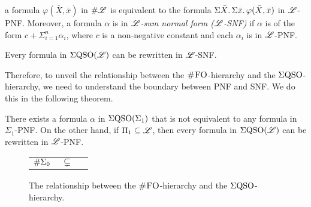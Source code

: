 a formula $\varphi(\bar{X}, \bar{x})$ in $\#\mathscr{L}$ is equivalent to the formula $\Sigma{\bar X}.\, \Sigma{\bar x}.\, \varphi(\bar{X}, \bar{x})$ in $\mathscr{L}$-PNF. 
Moreover, a formula $\alpha$ is in \emph{$\mathscr{L}$-sum normal form ($\mathscr{L}$-SNF)} if $\alpha$ is of the form $c + \Sigma_{i=1}^n \alpha_i$, where $c$ is a non-negative constant and each $\alpha_i$ is in 
$\mathscr{L}$-PNF.
\begin{theorem}\label{theo-pnf-snf}
Every formula in $\Sigma{\rm QSO}(\mathscr{L})$ can be rewritten in $\mathscr{L}$-SNF.
\end{theorem}
Therefore, to unveil the relationship between the $\text{\sc \#FO}$-hierarchy and the $\Sigma{\rm QSO}$-hierarchy, we need to understand the boundary between PNF and SNF. We do this in the following theorem. 
\begin{theorem}\label{theo-pi1-pnf}
There exists a formula $\alpha$ in $\Sigma{\rm QSO}(\Sigma_{1})$ that is not equivalent to any formula in $\Sigma_1$-PNF. 
On the other hand, if $\Pi_{1} \subseteq \mathscr{L}$, then 
	every formula in
	$\Sigma{\rm QSO}(\mathscr{L})$ can be rewritten in $\mathscr{L}$-PNF. 
\end{theorem}

\begin{figure*}

\begin{center}
\begin{tabular}{ccc}
$\#\Sigma_{0}$ & $\subsetneq$ & 
\end{tabular}
\end{center}

\caption{The relationship between the $\text{\sc \#FO}$-hierarchy and the $\Sigma{\rm QSO}$-hierarchy.\label{fir-sfo-eqso}}
\end{figure*}


